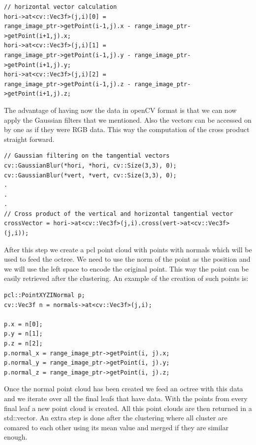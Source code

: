 \documentclass[fontsize=12pt]{article}
\begin{document}
\begin{lstlisting}
// horizontal vector calculation
hori->at<cv::Vec3f>(j,i)[0] = 
range_image_ptr->getPoint(i-1,j).x - range_image_ptr->getPoint(i+1,j).x;
hori->at<cv::Vec3f>(j,i)[1] = 
range_image_ptr->getPoint(i-1,j).y - range_image_ptr->getPoint(i+1,j).y;
hori->at<cv::Vec3f>(j,i)[2] =
range_image_ptr->getPoint(i-1,j).z - range_image_ptr->getPoint(i+1,j).z;
\end{lstlisting}

The advantage of having now the data in openCV format is that we can now apply the Gaussian filters that we mentioned. Also the vectors can be accessed on by one as if they were RGB data. This way the computation of the cross product straight forward.

\begin{lstlisting}
// Gaussian filtering on the tangential vectors
cv::GaussianBlur(*hori, *hori, cv::Size(3,3), 0);
cv::GaussianBlur(*vert, *vert, cv::Size(3,3), 0);
.
.
.
// Cross product of the vertical and horizontal tangential vector
crossVector = hori->at<cv::Vec3f>(j,i).cross(vert->at<cv::Vec3f>(j,i));
\end{lstlisting}

After this step we create a pcl point cloud with points with normals which will be used to feed the octree. We need to use the norm of the point as the position and we will use the left space to encode the original point. This way the point can be easily retrieved after the clustering. An example of the creation of such points is:

\begin{lstlisting}
pcl::PointXYZINormal p;
cv::Vec3f n = normals->at<cv::Vec3f>(j,i);

p.x = n[0];
p.y = n[1];
p.z = n[2];
p.normal_x = range_image_ptr->getPoint(i, j).x;
p.normal_y = range_image_ptr->getPoint(i, j).y;
p.normal_z = range_image_ptr->getPoint(i, j).z;
\end{lstlisting}

Once the normal point cloud has been created we feed an octree with this data and we iterate over all the final leafs that have data. With the points from every final leaf a new point cloud is created. All this point clouds are then returned in a std::vector. An extra step is done after the clustering where all cluster are comared to each other using its mean value and merged if they are similar enough.\\
\end{document}
